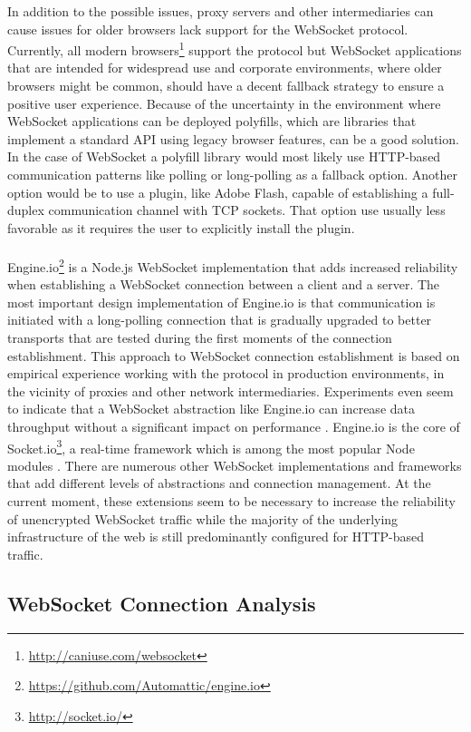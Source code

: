 In addition to the possible issues, proxy servers and other intermediaries can cause issues for older browsers lack support for the WebSocket protocol. Currently, all modern browsers\footnote{\url{http://caniuse.com/websocket}} support the protocol but WebSocket applications that are intended for widespread use and corporate environments, where older browsers might be common, should have a decent fallback strategy to ensure a positive user experience. Because of the uncertainty in the environment where WebSocket applications can be deployed polyfills, which are libraries that implement a standard API using legacy browser features, can be a good solution. In the case of WebSocket a polyfill library would most likely use HTTP-based communication patterns like polling or long-polling as a fallback option. Another option would be to use a plugin, like Adobe Flash, capable of establishing a full-duplex communication channel with TCP sockets. That option use usually less favorable as it requires the user to explicitly install the plugin.
\\ \\
Engine.io\footnote{\url{https://github.com/Automattic/engine.io}} is a Node.js WebSocket implementation that adds increased reliability when establishing a WebSocket connection between a client and a server. The most important design implementation of Engine.io is that communication is initiated with a long-polling connection that is gradually upgraded to better transports that are tested during the first moments of the connection establishment. This approach to WebSocket connection establishment is based on empirical experience working with the protocol in production environments, in the vicinity of proxies and other network intermediaries. Experiments even seem to indicate that a WebSocket abstraction like Engine.io can increase data throughput without a significant impact on performance \cite{ozger2014websocket}. Engine.io is the core of Socket.io\footnote{\url{http://socket.io/}}, a real-time framework which is among the most popular Node modules \cite{npmStarred}. There are numerous other WebSocket implementations and frameworks that add different levels of abstractions and connection management. At the current moment, these extensions seem to be necessary to increase the reliability of unencrypted WebSocket traffic while the majority of the underlying infrastructure of the web is still predominantly configured for HTTP-based traffic.

\subsection{WebSocket Connection Analysis}

